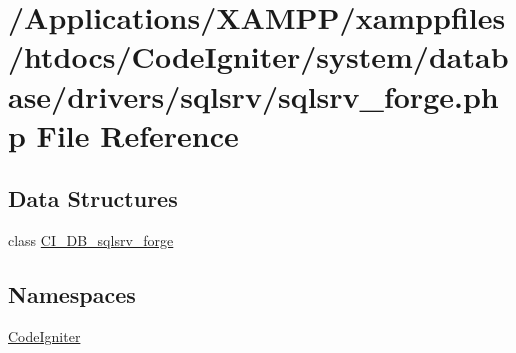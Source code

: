 \hypertarget{sqlsrv__forge_8php}{}\section{/\+Applications/\+X\+A\+M\+P\+P/xamppfiles/htdocs/\+Code\+Igniter/system/database/drivers/sqlsrv/sqlsrv\+\_\+forge.php File Reference}
\label{sqlsrv__forge_8php}
\subsection*{Data Structures}
\begin{DoxyCompactItemize}
\item 
class \mbox{\hyperlink{class_c_i___d_b__sqlsrv__forge}{C\+I\+\_\+\+D\+B\+\_\+sqlsrv\+\_\+forge}}
\end{DoxyCompactItemize}
\subsection*{Namespaces}
\begin{DoxyCompactItemize}
\item 
 \mbox{\hyperlink{namespace_code_igniter}{Code\+Igniter}}
\end{DoxyCompactItemize}
